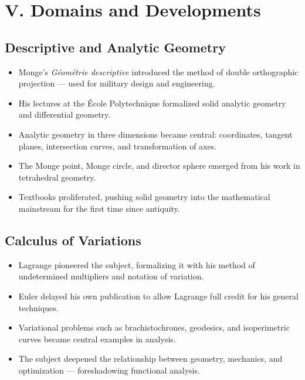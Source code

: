 \documentclass[9pt]{article}
\begin{document}
\newpage

\section*{V. Domains and Developments}

\subsection*{Descriptive and Analytic Geometry}
\begin{itemize}
  \item Monge’s \textit{Géométrie descriptive} introduced the method of double orthographic projection — used for military design and engineering.
  \item His lectures at the École Polytechnique formalized solid analytic geometry and differential geometry.
  \item Analytic geometry in three dimensions became central: coordinates, tangent planes, intersection curves, and transformation of axes.
  \item The Monge point, Monge circle, and director sphere emerged from his work in tetrahedral geometry.
  \item Textbooks proliferated, pushing solid geometry into the mathematical mainstream for the first time since antiquity.
\end{itemize}

\subsection*{Calculus of Variations}
\begin{itemize}
  \item Lagrange pioneered the subject, formalizing it with his method of undetermined multipliers and notation of variation.
  \item Euler delayed his own publication to allow Lagrange full credit for his general techniques.
  \item Variational problems such as brachistochrones, geodesics, and isoperimetric curves became central examples in analysis.
  \item The subject deepened the relationship between geometry, mechanics, and optimization — foreshadowing functional analysis.
\end{itemize}
\end{document}
